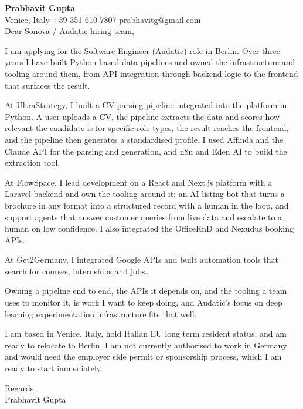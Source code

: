 \documentclass[a4paper,10.5pt]{article}
\begin{document}
\textbf{Prabhavit Gupta}\\
Venice, Italy \textbar{} +39 351 610 7807 \textbar{} prabhavitg@gmail.com\\[10pt]
Dear Sonova / Audatic hiring team,

I am applying for the Software Engineer (Audatic) role in Berlin. Over three years I have built Python based data pipelines and owned the infrastructure and tooling around them, from API integration through backend logic to the frontend that surfaces the result.

At UltraStrategy, I built a CV-parsing pipeline integrated into the platform in Python. A user uploads a CV, the pipeline extracts the data and scores how relevant the candidate is for specific role types, the result reaches the frontend, and the pipeline then generates a standardised profile. I used Affinda and the Claude API for the parsing and generation, and n8n and Eden AI to build the extraction tool.

At FlowSpace, I lead development on a React and Next.js platform with a Laravel backend and own the tooling around it: an AI listing bot that turns a brochure in any format into a structured record with a human in the loop, and support agents that answer customer queries from live data and escalate to a human on low confidence. I also integrated the OfficeRnD and Nexudus booking APIs.

At Get2Germany, I integrated Google APIs and built automation tools that search for courses, internships and jobs.

Owning a pipeline end to end, the APIs it depends on, and the tooling a team uses to monitor it, is work I want to keep doing, and Audatic's focus on deep learning experimentation infrastructure fits that well.

I am based in Venice, Italy, hold Italian EU long term resident status, and am ready to relocate to Berlin. I am not currently authorised to work in Germany and would need the employer side permit or sponsorship process, which I am ready to start immediately.

Regards,\\
Prabhavit Gupta
\end{document}
